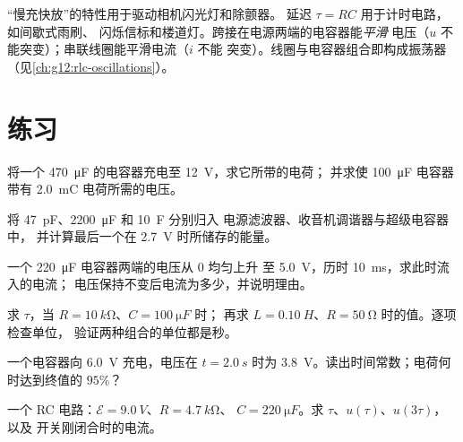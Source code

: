 \begin{remark}[两类计时电路的用途]\label{rem:g12:rc-rl-circuits:applications}
“慢充快放”的特性用于驱动相机闪光灯和除颤器。
延迟 $\tau = RC$ 用于计时电路，如间歇式雨刷、
闪烁信标和楼道灯。跨接在电源两端的电容器能\emph{平滑}
电压（$u$ 不能突变）；串联线圈能平滑电流（$i$ 不能
突变）。线圈与电容器组合即构成振荡器
（见\cref{ch:g12:rlc-oscillations}）。
\end{remark}

\section{练习}

\begin{exercise}[$\star$]\label{exo:g12:rc-rl-circuits:1}
将一个 \qty{470}{\micro F} 的电容器充电至 \qty{12}{V}，求它所带的电荷；
并求使 \qty{100}{\micro F} 电容器带有 \qty{2.0}{mC} 电荷所需的电压。
\end{exercise}

\begin{exercise}[$\star$]\label{exo:g12:rc-rl-circuits:2}
将 \qty{47}{pF}、\qty{2200}{\micro F} 和 \qty{10}{F} 分别归入
电源滤波器、收音机调谐器与超级电容器中，
并计算最后一个在 \qty{2.7}{V} 时所储存的能量。
\end{exercise}

\begin{exercise}[$\star$]\label{exo:g12:rc-rl-circuits:3}
一个 \qty{220}{\micro F} 电容器两端的电压从 $0$ 均匀上升
至 \qty{5.0}{V}，历时 \qty{10}{ms}，求此时流入的电流；
电压保持不变后电流为多少，并说明理由。
\end{exercise}

\begin{exercise}[$\star$]\label{exo:g12:rc-rl-circuits:4}
求 $\tau$，当 $R = \qty{10}{k\ohm}$、$C = \qty{100}{\micro F}$ 时；
再求 $L = \qty{0.10}{H}$、$R = \qty{50}{\ohm}$ 时的值。逐项检查单位，
验证两种组合的单位都是秒。
\end{exercise}

\begin{exercise}[$\star$]\label{exo:g12:rc-rl-circuits:5}
一个电容器向 \qty{6.0}{V} 充电，电压在
$t = \qty{2.0}{s}$ 时为 \qty{3.8}{V}。读出时间常数；电荷何时达到终值的 $95\%$？
\end{exercise}

\begin{exercise}[$\star\star$]\label{exo:g12:rc-rl-circuits:6}
一个 RC 电路：$\mathcal{E} = \qty{9.0}{V}$、$R = \qty{4.7}{k\ohm}$、
$C = \qty{220}{\micro F}$。求 $\tau$、$u(\tau)$、$u(3\tau)$，以及
开关刚闭合时的电流。
\end{exercise}

